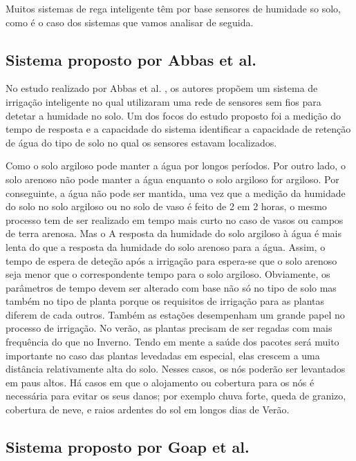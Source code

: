 \documentclass[conference]{IEEEtran}
\begin{document}
Muitos sistemas de rega inteligente têm por base sensores de humidade so solo, como 
é o caso dos sistemas que vamos analisar de seguida.

\subsection{Sistema proposto por Abbas et al.}

No estudo realizado por Abbas et al. \cite{abbas2014smart}, os autores propõem 
um sistema de irrigação inteligente no qual utilizaram uma rede de sensores sem 
fios para detetar a humidade no solo. Um dos focos do estudo proposto foi a medição 
do tempo de resposta e a capacidade do sistema identificar a capacidade de 
retenção de água do tipo de solo no qual os sensores estavam localizados. 

Como o solo argiloso pode manter a água por longos períodos. Por outro lado, 
o solo arenoso não pode manter a água enquanto o solo argiloso for argiloso. 
Por conseguinte, a água não pode ser mantida, uma vez que a medição da 
humidade do solo no solo argiloso ou no solo de vaso é feito de 2 em 2 horas, 
o mesmo processo tem de ser realizado em tempo mais curto no caso de vasos 
ou campos de terra arenosa. Mas o A resposta da humidade do solo argiloso 
à água é mais lenta do que a resposta da humidade do solo arenoso para a água. 
Assim, o tempo de espera de deteção após a irrigação para espera-se que o solo 
arenoso seja menor que o correspondente tempo para o solo argiloso. Obviamente, 
os parâmetros de tempo devem ser alterado com base não só no tipo de solo mas 
também no tipo de planta porque os requisitos de irrigação para as plantas 
diferem de cada outros. Também as estações desempenham um grande papel no 
processo de irrigação. No verão, as plantas precisam de ser regadas com mais 
frequência do que no Inverno. Tendo em mente a saúde dos pacotes será muito 
importante no caso das plantas levedadas em especial, elas crescem a uma 
distância relativamente alta do solo. Nesses casos, os nós poderão ser 
levantados em paus altos. Há casos em que o alojamento ou cobertura 
para os nós é necessária para evitar os seus danos; por exemplo 
chuva forte, queda de granizo, cobertura de neve, e raios ardentes 
do sol em longos dias de Verão. \cite{abbas2014smart}

\subsection{Sistema proposto por Goap et al.}
\end{document}
